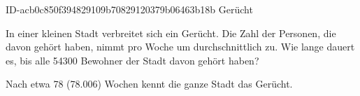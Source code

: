 \begin{exercise}
      {ID-acb0c850f394829109b70829120379b06463b18b}
      {Gerücht}
  \ifproblem\problem\par
    In einer kleinen Stadt verbreitet sich ein Gerücht. Die Zahl der Personen,
    die davon gehört haben, nimmt pro Woche um durchschnittlich  zu.
    Wie lange dauert es, bis alle \num{54300} Bewohner der Stadt davon gehört
    haben?
  \fi
  \ifoutcome\outcome\par
    Nach etwa 78 (\num{78.006}) Wochen kennt die ganze Stadt das Gerücht.
  \fi
\end{exercise}
